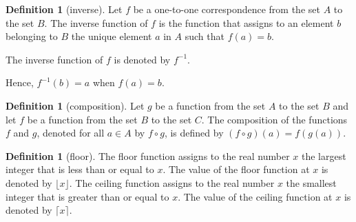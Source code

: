 \documentclass[letterpaper,10pt]{article}
\theoremstyle{plain}
\theoremstyle{definition}
\newtheorem{defn}[thm]{Definition}
\theoremstyle{remark}
\begin{document}
\begin{defn}[inverse]
Let $f$ be a one-to-one correspondence from the set $A$ to the set $B$. The inverse function of
$f$ is the function that assigns to an element $b$ belonging to $B$ the unique element $a$ in $A$
such that $f(a)=b$.

The inverse function of $f$ is denoted by $f^{-1}$. 

Hence, $f^{-1}(b)=a$
when
$f(a)=b$.


\end{defn}

\begin{defn}[composition]
Let $g$ be a function from the set $A$ to the set $B$ and let $f$ be a function from the set $B$ to the
set $C$. The composition of the functions $f$ and $g$, denoted for all $a \in A$ by $f \circ g$, is defined
by
$(f \circ g)(a) = f (g(a))$.
\end{defn}
\begin{defn}[floor]
The floor function assigns to the real number $x$ the largest integer that is less than or equal to
$x$. The value of the floor function at $x$ is denoted by $\lfloor x \rfloor$. The ceiling function assigns to the
real number $x$ the smallest integer that is greater than or equal to $x$. The value of the ceiling
function at $x$ is denoted by $\lceil x \rceil$.
\end{defn}
\end{document}
